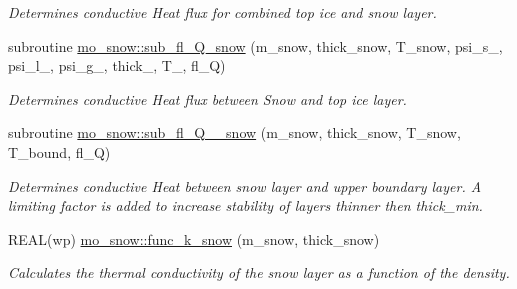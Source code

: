 \begin{DoxyCompactItemize}
\begin{DoxyCompactList}\small\item\em Determines conductive Heat flux for combined top ice and snow layer. \item\end{DoxyCompactList}\item 
subroutine \hyperlink{namespacemo__snow_a8a1a43bdb1400602404c56efd1c33e51}{mo\_\-snow::sub\_\-fl\_\-Q\_\-snow} (m\_\-snow, thick\_\-snow, T\_\-snow, psi\_\-s\_, psi\_\-l\_, psi\_\-g\_, thick\_, T\_, fl\_\-Q)
\begin{DoxyCompactList}\small\item\em Determines conductive Heat flux between Snow and top ice layer. \item\end{DoxyCompactList}\item 
subroutine \hyperlink{namespacemo__snow_ae998551477b1c51b6a7dfe7688da0c16}{mo\_\-snow::sub\_\-fl\_\-Q\_\_\-snow} (m\_\-snow, thick\_\-snow, T\_\-snow, T\_\-bound, fl\_\-Q)
\begin{DoxyCompactList}\small\item\em Determines conductive Heat between snow layer and upper boundary layer. A limiting factor is added to increase stability of layers thinner then thick\_\-min. \item\end{DoxyCompactList}\item 
REAL(wp) \hyperlink{namespacemo__snow_ae04b8ab00ed0ed7c4f89c56d3893bbfe}{mo\_\-snow::func\_\-k\_\-snow} (m\_\-snow, thick\_\-snow)
\begin{DoxyCompactList}\small\item\em Calculates the thermal conductivity of the snow layer as a function of the density. \item\end{DoxyCompactList}\end{DoxyCompactItemize}
